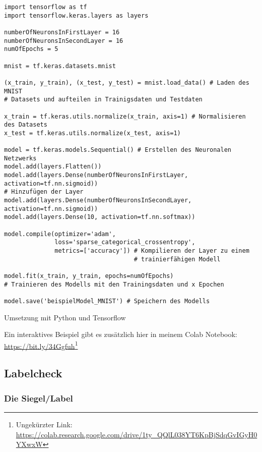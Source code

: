 \begin{listing}[H]
    \begin{verbatim}
import tensorflow as tf
import tensorflow.keras.layers as layers

numberOfNeuronsInFirstLayer = 16 
numberOfNeuronsInSecondLayer = 16 
numOfEpochs = 5 

mnist = tf.keras.datasets.mnist

(x_train, y_train), (x_test, y_test) = mnist.load_data() # Laden des MNIST
# Datasets und aufteilen in Trainigsdaten und Testdaten

x_train = tf.keras.utils.normalize(x_train, axis=1) # Normalisieren des Datasets
x_test = tf.keras.utils.normalize(x_test, axis=1)

model = tf.keras.models.Sequential() # Erstellen des Neuronalen Netzwerks
model.add(layers.Flatten())
model.add(layers.Dense(numberOfNeuronsInFirstLayer, activation=tf.nn.sigmoid))
# Hinzufügen der Layer
model.add(layers.Dense(numberOfNeuronsInSecondLayer, activation=tf.nn.sigmoid))
model.add(layers.Dense(10, activation=tf.nn.softmax))

model.compile(optimizer='adam',
              loss='sparse_categorical_crossentropy',
              metrics=['accuracy']) # Kompilieren der Layer zu einem
                                    # trainierfähigen Modell

model.fit(x_train, y_train, epochs=numOfEpochs)
# Trainieren des Modells mit den Trainingsdaten und x Epochen

model.save('beispielModel_MNIST') # Speichern des Modells

    \end{verbatim}
    \caption{Umsetzung mit Python und Tensorflow}
\end{listing}
Ein interaktives Beispiel gibt es zusätzlich hier in meinem Colab Notebook: \url{https://bit.ly/34Ggfuh}\footnote{Ungekürzter Link: \url{https://colab.research.google.com/drive/1ty_QQlL038YT6KpBjSdqGvIGyH0YXwxW}}

\subsection{Labelcheck}\label{anhang:labelchecktf}

\subsubsection{Die Siegel/Label}\label{angang:label}

